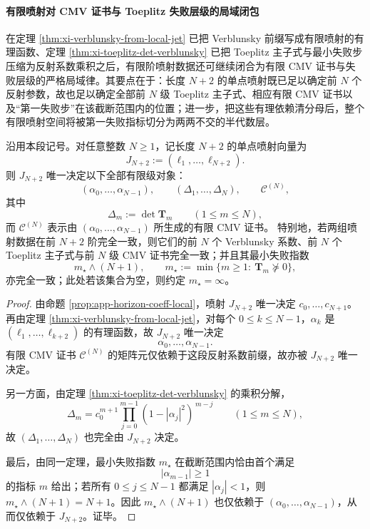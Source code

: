 \paragraph{有限喷射对 CMV 证书与 Toeplitz 失败层级的局域闭包}
在定理 \ref{thm:xi-verblunsky-from-local-jet} 已把 Verblunsky 前缀写成有限喷射的有理函数、定理 \ref{thm:xi-toeplitz-det-verblunsky} 已把 Toeplitz 主子式与最小失败步压缩为反射系数乘积之后，有限阶喷射数据还可继续闭合为有限 CMV 证书与失败层级的严格局域律。其要点在于：长度 \(N{+}2\) 的单点喷射既已足以确定前 \(N\) 个反射参数，故也足以确定全部前 \(N\) 级 Toeplitz 主子式、相应有限 CMV 证书以及“第一失败步”在该截断范围内的位置；进一步，把这些有理依赖清分母后，整个有限喷射空间将被第一失败指标切分为两两不交的半代数层。

\begin{theorem}\label{thm:xi-local-jet-determines-finite-cmv-and-toeplitz-certificate}
沿用本段记号。对任意整数 \(N\ge 1\)，记长度 \(N{+}2\) 的单点喷射向量为
\[
J_{N+2}:=(\ell_1,\dots,\ell_{N+2}).
\]
则 \(J_{N+2}\) 唯一决定以下全部有限级对象：
\[
(\alpha_0,\dots,\alpha_{N-1}),
\qquad
(\Delta_1,\dots,\Delta_N),
\qquad
\mathcal C^{(N)},
\]
其中
\[
\Delta_m:=\det \mathbf T_m\qquad(1\le m\le N),
\]
而 \(\mathcal C^{(N)}\) 表示由 \((\alpha_0,\dots,\alpha_{N-1})\) 所生成的有限 CMV 证书。
特别地，若两组喷射数据在前 \(N{+}2\) 阶完全一致，则它们的前 \(N\) 个 Verblunsky 系数、前 \(N\) 个 Toeplitz 主子式与前 \(N\) 级 CMV 证书完全一致；并且其最小失败指数
\[
m_\star\wedge (N+1),
\qquad
m_\star:=\min\{m\ge 1:\ \mathbf T_m\nsucceq 0\},
\]
亦完全一致；此处若该集合为空，则约定 \(m_\star=\infty\)。
\end{theorem}
\begin{proof}
由命题 \ref{prop:app-horizon-coeff-local}，喷射 \(J_{N+2}\) 唯一决定 \(c_0,\dots,c_{N+1}\)。再由定理 \ref{thm:xi-verblunsky-from-local-jet}，对每个 \(0\le k\le N-1\)，\(\alpha_k\) 是 \((\ell_1,\dots,\ell_{k+2})\) 的有理函数，故 \(J_{N+2}\) 唯一决定
\[
\alpha_0,\dots,\alpha_{N-1}.
\]
有限 CMV 证书 \(\mathcal C^{(N)}\) 的矩阵元仅依赖于这段反射系数前缀，故亦被 \(J_{N+2}\) 唯一决定。

另一方面，由定理 \ref{thm:xi-toeplitz-det-verblunsky} 的乘积分解，
\[
\Delta_m
=
c_0^{m+1}\prod_{j=0}^{m-1}(1-|\alpha_j|^2)^{\,m-j}
\qquad(1\le m\le N),
\]
故 \((\Delta_1,\dots,\Delta_N)\) 也完全由 \(J_{N+2}\) 决定。

最后，由同一定理，最小失败指数 \(m_\star\) 在截断范围内恰由首个满足
\[
|\alpha_{m-1}|\ge 1
\]
的指标 \(m\) 给出；若所有 \(0\le j\le N-1\) 都满足 \(|\alpha_j|<1\)，则 \(m_\star\wedge (N+1)=N+1\)。因此 \(m_\star\wedge (N+1)\) 也仅依赖于 \((\alpha_0,\dots,\alpha_{N-1})\)，从而仅依赖于 \(J_{N+2}\)。证毕。
\end{proof}

